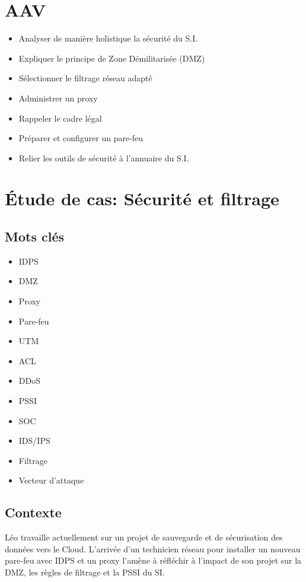 \section*{AAV}
\begin{itemize}
  \item [4] Analyser de manière holistique la sécurité du S.I.
  \item [2] Expliquer le principe de Zone Démilitarisée (DMZ)
  \item [4] Sélectionner le filtrage réseau adapté
  \item [3] Administrer un proxy
  \item [1] Rappeler le cadre légal
  \item [3] Préparer et configurer un pare-feu
  \item [3] Relier les outils de sécurité à l'annuaire du S.I.
\end{itemize}

\section*{Étude de cas: Sécurité et filtrage }

\subsection*{Mots clés}
{}
\begin{itemize}
  \item IDPS
  \item DMZ
  \item Proxy 
  \item Pare-feu
  \item UTM
  \item ACL 
  \item DDoS
  \item PSSI 
  \item SOC 
  \item IDS/IPS 
  \item Filtrage 
  \item Vecteur d'attaque
\end{itemize}

\subsection*{Contexte}
{}
Léo travaille actuellement sur un projet de sauvegarde et de sécurisation des données vers le Cloud. L’arrivée d’un technicien réseau pour installer un nouveau pare-feu avec IDPS et un proxy l’amène à réfléchir à l’impact de son projet sur la DMZ, les règles de filtrage et la PSSI du SI.


